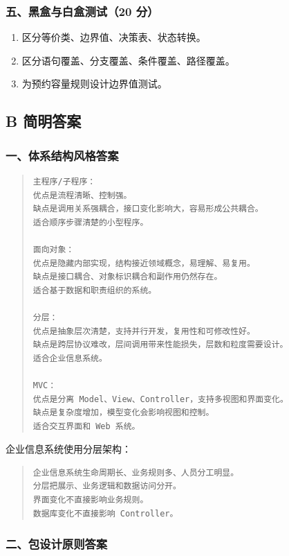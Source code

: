 \documentclass[UTF8,zihao=-4]{ctexart}
\begin{document}
\subsubsection*{五、黑盒与白盒测试（20 分）}


\begin{enumerate}
\item 区分等价类、边界值、决策表、状态转换。
\item 区分语句覆盖、分支覆盖、条件覆盖、路径覆盖。
\item 为预约容量规则设计边界值测试。
\end{enumerate}


\subsection{B 简明答案}


\subsubsection*{一、体系结构风格答案}


\begin{quote}
\footnotesize
\begin{verbatim}
主程序/子程序：
优点是流程清晰、控制强。
缺点是调用关系强耦合，接口变化影响大，容易形成公共耦合。
适合顺序步骤清楚的小型程序。

面向对象：
优点是隐藏内部实现，结构接近领域概念，易理解、易复用。
缺点是接口耦合、对象标识耦合和副作用仍然存在。
适合基于数据和职责组织的系统。

分层：
优点是抽象层次清楚，支持并行开发，复用性和可修改性好。
缺点是跨层协议难改，层间调用带来性能损失，层数和粒度需要设计。
适合企业信息系统。

MVC：
优点是分离 Model、View、Controller，支持多视图和界面变化。
缺点是复杂度增加，模型变化会影响视图和控制。
适合交互界面和 Web 系统。
\end{verbatim}
\end{quote}


企业信息系统使用分层架构：


\begin{quote}
\footnotesize
\begin{verbatim}
企业信息系统生命周期长、业务规则多、人员分工明显。
分层把展示、业务逻辑和数据访问分开。
界面变化不直接影响业务规则。
数据库变化不直接影响 Controller。
\end{verbatim}
\end{quote}


\subsubsection*{二、包设计原则答案}
\end{document}
